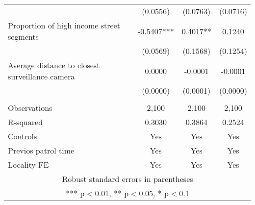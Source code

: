 \documentclass[]{article}
\begin{document}
\begin{tabular}{lccc}
 & (0.0556) & (0.0763) & (0.0716) \\
Proportion of high income street segments & -0.5407*** & 0.4017** & 0.1240 \\
 & (0.0569) & (0.1568) & (0.1254) \\
Average distance to closest surveillance camera & 0.0000 & -0.0001 & -0.0001 \\
 & (0.0000) & (0.0001) & (0.0000) \\
 &  &  &  \\
Observations & 2,100 & 2,100 & 2,100 \\
R-squared & 0.3030 & 0.3864 & 0.2524 \\
Controls & Yes & Yes & Yes \\
Previos patrol time & Yes & Yes & Yes \\
 Locality FE & Yes & Yes & Yes \\ \hline
\multicolumn{4}{c}{ Robust standard errors in parentheses} \\
\multicolumn{4}{c}{ *** p$<$0.01, ** p$<$0.05, * p$<$0.1} \\
\end{tabular}
\end{document}
